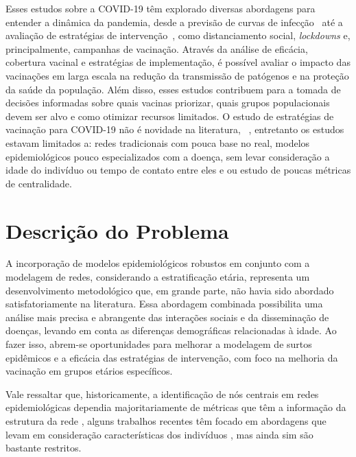 Esses estudos sobre a COVID-19 têm explorado diversas abordagens para entender a dinâmica da pandemia, desde a previsão de curvas de infecção~\cite{Xiang2021} até a avaliação de estratégias de intervenção~\cite{Liu2022,kitsak2010identification}, como distanciamento social, \textit{lockdowns} e, principalmente, campanhas de vacinação. Através da análise de eficácia, cobertura vacinal e estratégias de implementação, é possível avaliar o impacto das vacinações em larga escala na redução da transmissão de patógenos e na proteção da saúde da população. Além disso, esses estudos contribuem para a tomada de decisões informadas sobre quais vacinas priorizar, quais grupos populacionais devem ser alvo e como otimizar recursos limitados. O estudo de estratégias de vacinação para COVID-19 não é novidade na literatura, ~\cite{Doostmohammadian2020,Tetteh2021,Chen2022,Petrizzelli2022}, entretanto os estudos estavam limitados a: redes tradicionais com pouca base no real, modelos epidemiológicos pouco especializados com a doença, sem levar consideração a idade do indivíduo ou tempo de contato entre eles e ou estudo de poucas métricas de centralidade.


\section{Descrição do Problema}

A incorporação de modelos epidemiológicos robustos em conjunto com a modelagem de redes, considerando a estratificação etária, representa um desenvolvimento metodológico que, em grande parte, não havia sido abordado satisfatoriamente na literatura. Essa abordagem combinada possibilita uma análise mais precisa e abrangente das interações sociais e da disseminação de doenças, levando em conta as diferenças demográficas relacionadas à idade. Ao fazer isso, abrem-se oportunidades para melhorar a modelagem de surtos epidêmicos e a eficácia das estratégias de intervenção, com foco na melhoria da vacinação em grupos etários específicos.


Vale ressaltar que, historicamente, a identificação de nós centrais em redes epidemiológicas dependia majoritariamente de métricas que têm a informação da estrutura da rede \cite{miller2007effective,kitsak2010identification,salathe2010dynamics}, alguns trabalhos recentes têm focado em abordagens que levam em consideração características dos indivíduos \cite{chen2021age,klise2022prioritizing}, mas ainda sim são bastante restritos.\\


